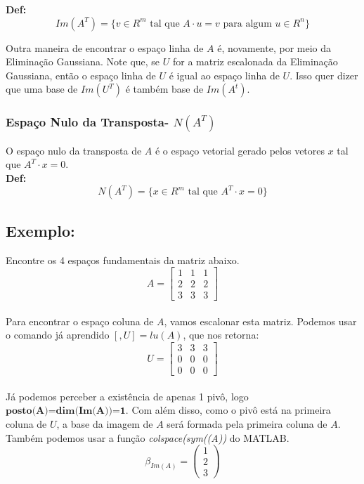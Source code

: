 \documentclass[12pt]{article}
\begin{document}
	\textbf{Def:}
	\begin{equation*}
		Im(A^T)=\{v \in R^m \mbox{ tal que } A\cdot u=v \mbox{ para algum }u\in R^n\}
	\end{equation*}
	
	Outra maneira de encontrar o espaço linha de $A$ é, novamente, por meio da Eliminação Gaussiana. Note que, se $U$ for a matriz escalonada da Eliminação Gaussiana, então o espaço linha de $U$ é igual ao espaço linha de $U$. Isso quer dizer que uma base de $Im(U^T)$ é também base de $Im(A^t)$.
	
	\subsubsection{Espaço Nulo da Transposta- $N(A^T)$}
	
	O espaço nulo da transposta de $A$ é o espaço vetorial gerado pelos vetores $x$ tal que $A^T\cdot x=0$.\\
	
	\textbf{Def:}
	\begin{equation*}
		N(A^T)=\{x \in R^m \mbox{ tal que }A^T\cdot x=0\}
	\end{equation*}
	
	
	\subsection{Exemplo:}
	
	Encontre os 4 espaços fundamentais da matriz abaixo.
	\begin{equation*}
		A= 
		\begin{bmatrix}
			1 & 1 & 1\\
			2 & 2 & 2\\
			3 & 3 & 3
		\end{bmatrix}	
	\end{equation*}\\
	
	Para encontrar o espaço coluna de $A$, vamos escalonar esta matriz. Podemos usar o comando já aprendido $[,U]=lu(A)$, que nos retorna:
	\begin{equation*}
		U= 
		\begin{bmatrix}
			3 & 3 & 3\\
			0 & 0 & 0\\
			0 & 0 & 0
		\end{bmatrix}	
	\end{equation*}\\
	
	Já podemos perceber a existência de apenas 1 pivô, logo $\textbf{posto(A)=dim(Im(A))=1}$. Com além disso, como o pivô está na primeira coluna de $U$, a base da imagem de $A$ será formada pela primeira coluna de $A$. Também podemos usar a função \textit{colspace(sym((A))} do MATLAB.
	\begin{equation*}
		\beta_{Im(A)}= 
		\begin{pmatrix}
			1\\
			2\\
			3
		\end{pmatrix}	
	\end{equation*}\\
	
\end{document}
